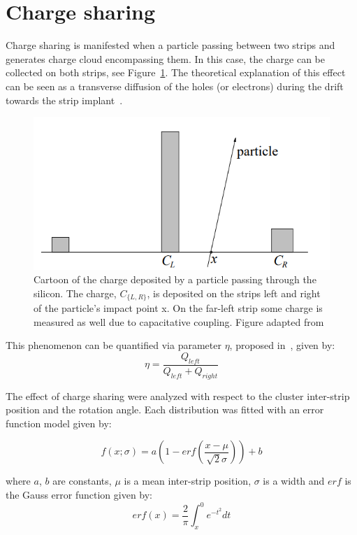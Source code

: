 \section{Charge sharing}
Charge sharing is manifested when a particle passing between two strips and generates charge cloud encompassing them. In this case, the charge can be collected on both  strips, see Figure~\ref{fig:eta}. The theoretical explanation of this effect can be seen as a transverse diffusion of the holes (or electrons) during the drift towards the strip implant~\cite{semiconductors_det_sys}. 

\begin{figure}[htb]
\centering
\includegraphics[scale=0.8]{figures/eta/eta.PNG}
\caption{Cartoon of the charge deposited by a particle passing through the silicon. The charge, $C_{\{L, R\}}$, is deposited on the strips left and right of the particle’s impact point x. On the far-left strip some charge is measured as well due to capacitative coupling. Figure adapted from~\cite{eta_note} } 
\label{fig:eta}
\end{figure}

This phenomenon can be quantified via parameter $\eta$, proposed in~\cite{eta}, given by:
\begin{equation}
    \eta = \frac{Q_{left}}{Q_{left}+Q_{right}}
\end{equation}

The effect of charge sharing were analyzed with respect to the cluster inter-strip position and the rotation angle. Each distribution was fitted with an error function model given by:

\begin{equation}
\label{eq:eta_model}
f(x;\sigma) = a \left(1 - erf(\frac{x-\mu}{\sqrt{2}\sigma})\right) + b
\end{equation}

where $a$, $b$ are constants,  $\mu$ is a mean inter-strip position, $\sigma$ is a width and $erf$ is the Gauss error function given by:
\begin{equation}
erf(x) = \frac{2}{\pi} \int^{0}_{x} e^{-t^2} dt
\end{equation}

